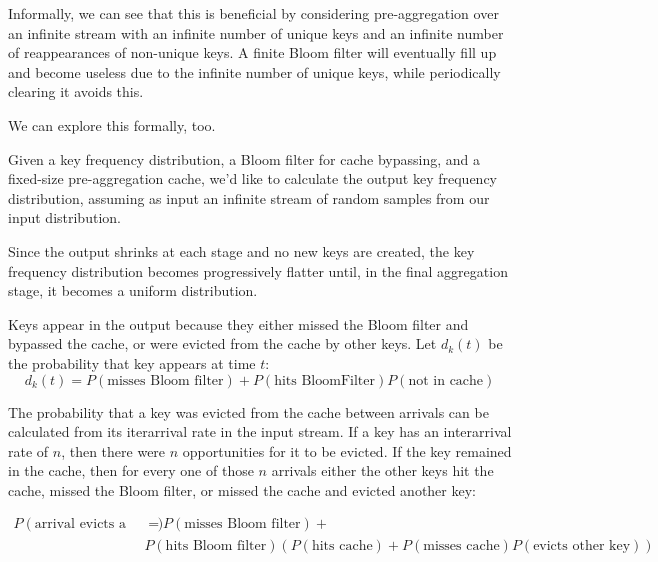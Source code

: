 \documentclass[12pt]{article}
\begin{document}
Informally, we can see that this is beneficial by considering pre-aggregation
over an infinite stream with an infinite number of unique keys and an infinite
number of reappearances of non-unique keys.  A finite Bloom filter will
eventually fill up and become useless due to the infinite number of unique
keys, while periodically clearing it avoids this.

We can explore this formally, too.

Given a key frequency distribution, a Bloom filter for cache bypassing, and
a fixed-size pre-aggregation cache, we'd like to calculate the output key
frequency distribution, assuming as input an infinite stream of random samples
from our input distribution.

Since the output shrinks at each stage and no new keys are created, the key
frequency distribution becomes progressively flatter until, in the final
aggregation stage, it becomes a uniform distribution.




Keys appear in the output because they either missed the Bloom filter and
bypassed the cache, or were evicted from the cache by other keys.  Let
$d_k(t)$ be the probability that key appears at time $t$:
\[
    d_k(t) = P\left(\text{misses Bloom filter}\right)
                +
             P\left(\text{hits BloomFilter}\right)
             P\left(\text{not in cache}\right)
\]

The probability that a key was evicted from the cache between arrivals can be
calculated from its iterarrival rate in the input stream.  If a key has an
interarrival rate of $n$, then there were $n$ opportunities for it to be
evicted.  If the key remained in the cache, then for every one of those $n$
arrivals either the other keys hit the cache, missed the Bloom filter, or
missed the cache and evicted another key:

\begin{align*}
    P\left(\text{arrival evicts a particular key}\right)
    &=  P\left(\text{misses Bloom filter}\right) + \\
    &
    P\left(\text{hits Bloom filter}\right)
    \left(
        P\left(\text{hits cache}\right)
        + P\left(\text{misses cache}\right)P\left(\text{evicts other key}\right)
    \right)
    \\
\end{align*}
\end{document}
